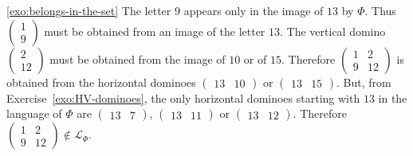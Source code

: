 \documentclass[12pt]{amsart}
\newcommand{\Lcal}{\mathcal{L}}
\begin{document}
\begin{exosolution}{\ref{exo:belongs-in-the-set}}
    The letter $9$ appears only in the image of $13$ by $\Phi$.
    Thus
    $\left(\begin{smallmatrix}1\\9\end{smallmatrix}\right)$
    must be obtained from an image of the letter $13$.
    The vertical domino $\left(\begin{smallmatrix}2\\12\end{smallmatrix}\right)$
    must be obtained from the image of $10$ or of $15$.
    Therefore
    $\left(\begin{smallmatrix}1 & 2\\9 & 12\end{smallmatrix}\right)$
        is obtained from the horizontal dominoes
    $\left(\begin{smallmatrix}13 & 10\end{smallmatrix}\right)$
        or
    $\left(\begin{smallmatrix}13 & 15\end{smallmatrix}\right)$.
        But, from Exercise~\ref{exo:HV-dominoes}, the only horizontal dominoes
        starting with $13$ in the language of $\Phi$ are
    $\left(\begin{smallmatrix}13 & 7\end{smallmatrix}\right)$,
    $\left(\begin{smallmatrix}13 & 11\end{smallmatrix}\right)$ or
    $\left(\begin{smallmatrix}13 & 12\end{smallmatrix}\right)$.
        Therefore
    $\left(\begin{smallmatrix}1 & 2\\9 & 12\end{smallmatrix}\right)\notin\Lcal_\Phi$.
\end{exosolution}
\end{document}
